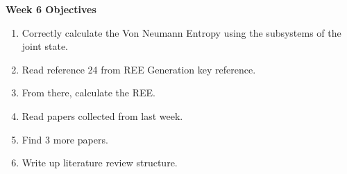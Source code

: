 \documentclass{article}
\begin{document}
\Large{\textbf{Week 6 Objectives}}
\\
\begin{enumerate}
    \item Correctly calculate the Von Neumann Entropy using the subsystems of the joint state. 
    \item Read reference 24 from REE Generation key reference.
    \item From there, calculate the REE.
    \item Read papers collected from last week.
    \item Find 3 more papers.
    \item Write up literature review structure. 
    


\end{enumerate}
\end{document}
